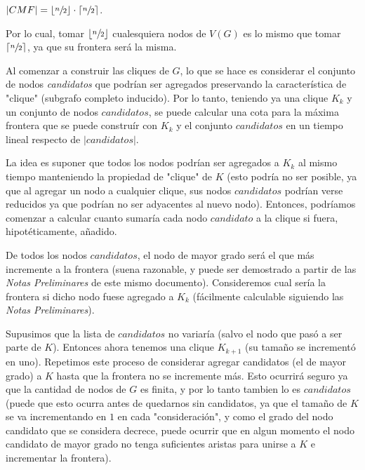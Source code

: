 \begin{description}
        \par $|CMF| = \lfloor\sfrac{n}{2}\rfloor \cdot \lceil\sfrac{n}{2}\rceil$.

        \par Por lo cual, tomar $\lfloor\sfrac{n}{2}\rfloor$ cualesquiera nodos de $V(G)$
            es lo mismo que tomar $\lceil\sfrac{n}{2}\rceil$, ya que su frontera ser\'a
            la misma.

    \item[M\'axima frontera de la rama: ] Al comenzar a construir las cliques de $G$,
        lo que se hace es considerar el conjunto de nodos \emph{candidatos} que podr\'ian
        ser agregados preservando la caracter\'istica de "clique" (subgrafo completo
        inducido). Por lo tanto, teniendo ya una clique $K_k$ y un conjunto de nodos
        $candidatos$, se puede calcular una cota para la m\'axima frontera que
        se puede constru\'ir con $K_k$ y el conjunto $candidatos$ en un tiempo
        lineal respecto de $|candidatos|$.

        \par La idea es suponer que todos los nodos podr\'ian ser agregados a $K_k$
            al mismo tiempo manteniendo la propiedad de "clique" de $K$ (esto podr\'ia
            no ser posible, ya que al agregar un nodo a cualquier clique, sus nodos
            $candidatos$ podr\'ian verse reducidos ya que podr\'ian no ser adyacentes
            al nuevo nodo). Entonces, podr\'iamos comenzar a calcular cuanto sumar\'ia
            cada nodo $candidato$ a la clique si fuera, hipot\'eticamente, a\~nadido.

        \par De todos los nodos $candidatos$, el nodo de mayor grado ser\'a el que m\'as
            incremente a la frontera (suena razonable, y puede ser demostrado a partir
            de las \emph{Notas Preliminares} de este mismo documento). Consideremos
            cual ser\'ia la frontera si dicho nodo fuese agregado a $K_k$ (f\'acilmente
            calculable siguiendo las \emph{Notas Preliminares}).

        \par Supusimos que la lista de $candidatos$ no variar\'ia (salvo el nodo que
            pas\'o a ser parte de $K$). Entonces ahora tenemos una clique $K_{k+1}$
            (su tama\~no se increment\'o en uno). Repetimos este proceso de considerar
            agregar candidatos (el de mayor grado) a $K$ hasta que la frontera no se
            incremente m\'as. Esto ocurrir\'a seguro ya que la cantidad de nodos de $G$
            es finita, y por lo tanto tambien lo es $candidatos$ (puede que esto ocurra
            antes de quedarnos sin candidatos, ya que el tama\~no de $K$ se va incrementando
            en $1$ en cada "consideraci\'on", y como el grado del nodo candidato que se
            considera decrece, puede ocurrir que en algun momento el nodo candidato de
            mayor grado no tenga suficientes aristas para unirse a $K$ e incrementar
            la frontera).


\end{description}
